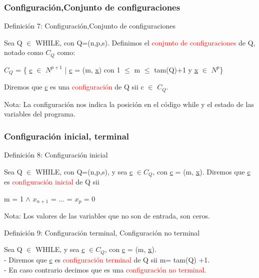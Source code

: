 \documentclass[xcolor=table]{beamer}
\begin{document}
\begin{frame}[fragile]\frametitle{Configuración,Conjunto de configuraciones } \small  

\begin{block}{Definición 7: Configuración,Conjunto de configuraciones}
\end{block}
Sea Q $\in$ WHILE, con Q=(n,p,s). Definimos el \textcolor{red}{conjunto de configuraciones} de Q, notado como $C_Q$ como:

\begin{center}
$C_Q$ = \{ \underline{c} $\in$ $N^{p+1}$ | \underline{c} = (m, \underline{x}) con 1 $\leq$ m $\leq$ tam(Q)+1 y \underline{x} $\in$ $N^p$\}
\end{center}

Diremos que \underline{c} es una \textcolor{red}{configuración} de Q sii c $\in$ $C_Q$.

\vspace{1cm}

\footnotesize Nota: La configuración nos indica la posición en el código while y el estado de las variables del programa.
\end{frame}

\begin{frame}[fragile]\frametitle{ Configuración inicial, terminal} \footnotesize  

\begin{block}{Definición 8: Configuración inicial}
\end{block}


Sea Q $\in$ WHILE, con Q=(n,p,s),  y sea \underline{c} $\in C_Q$, con \underline{c} = (m, \underline{x}). Diremos que \underline{c} es \textcolor{red}{configuración inicial}  de Q sii

\begin{center}
m = 1 $\wedge$ $x_{n+1}$ = $\ldots$ = $x_p$ = 0
\end{center}
\vspace{0.1cm}

\scriptsize Nota: Los valores de las variables que no son de entrada, son ceros.


\begin{block}{Definición 9: Configuración terminal, Configuración no terminal }
\end{block}

Sea Q $\in$ WHILE,  y sea \underline{c} $\in C_Q$, con \underline{c} = (m, \underline{x}). \\

- Diremos que \underline{c} es \textcolor{red}{configuración terminal} de Q sii m= tam(Q) +1.\\
- En caso contrario decimos que es una \textcolor{red}{configuración no terminal}.

\end{frame}
\end{document}
